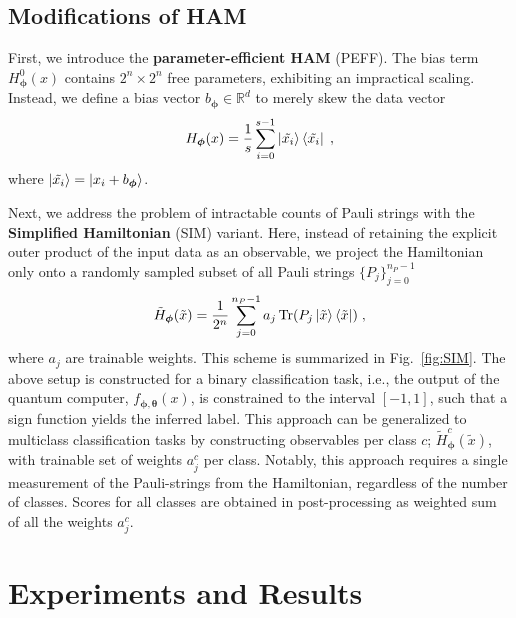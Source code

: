 \documentclass[../main.tex]{subfiles}
\begin{document}
\subsection{Modifications of HAM}

First, we introduce the \textbf{parameter-efficient HAM} (PEFF). The bias term $H_{\bm{\phi}}^0(x)$ contains $2^n \times 2^n$ free parameters, exhibiting an impractical scaling. Instead, we define a bias vector $b_{\bm{\phi}} \in \mathbb{R}^d$ to merely skew the data vector
\begin{equation}
    H_{\bm{\phi}}(x) = \frac{1}{s} \sum_{i=0}^{s-1} \ket{\tilde{x_i}}\bra{\tilde{x_i}} \; ,
\end{equation} where $\ket{\tilde{x_i}} = \ket{x_i + b_{\bm{\phi}}}$.

Next, we address the problem of intractable counts of Pauli strings with the \textbf{Simplified Hamiltonian} (SIM) variant. Here, instead of retaining the explicit outer product of the input data as an observable, we project the Hamiltonian only onto a randomly sampled subset of all Pauli strings $\{P_j\}_{j=0}^{n_P-1}$ 
\begin{equation} 
    \tilde{H}_{\bm{\phi}}(\tilde{x}) = \frac{1}{2^n} \sum_{j=0}^{n_P-1} a_j \Tr(P_j\ket{\tilde{x}}\bra{\tilde{x}}) \; ,
\end{equation} where $a_j$ are trainable weights. This scheme is summarized in Fig.~\ref{fig:SIM}.
The above setup is constructed for a binary classification task, i.e., the output of the quantum computer, $f_{\bm{\phi},\bm{\theta}}(x)$, is constrained to the interval $[-1,1]$, such that a sign function yields the inferred label. This approach can be generalized to multiclass classification tasks by constructing observables per class $c$; $\tilde{H}^c_{\bm{\phi}}(\tilde{x})$, with trainable set of weights $a^c_j$ per class. Notably, this approach requires a single measurement of the Pauli-strings from the Hamiltonian, regardless of the number of classes. Scores for all classes are obtained in post-processing as weighted sum of all the weights $a^c_j$.

\section{Experiments and Results}\label{sec:qnlpexpres}
\end{document}
